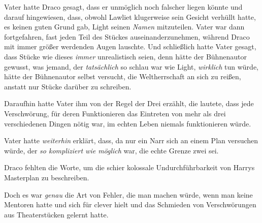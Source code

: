 Vater hatte Draco gesagt, dass er unmöglich noch falscher liegen könnte und darauf hingewiesen, dass, obwohl Lawliet klugerweise sein Gesicht verhüllt hatte, es keinen guten Grund gab, Light seinen \emph{Namen} mitzuteilen. Vater war dann fortgefahren, fast jeden Teil des Stückes auseinanderzunehmen, während Draco mit immer größer werdenden Augen lauschte. Und schließlich hatte Vater gesagt, dass Stücke wie dieses \emph{immer} unrealistisch seien, denn hätte der Bühnenautor gewusst, was jemand, der \emph{tatsächlich} so schlau war wie Light, \emph{wirklich} tun würde, hätte der Bühnenautor selbst versucht, die Weltherrschaft an sich zu reißen, anstatt nur Stücke darüber zu schreiben.

Daraufhin hatte Vater ihm von der Regel der Drei erzählt, die lautete, dass jede Verschwörung, für deren Funktionieren das Eintreten von mehr als drei verschiedenen Dingen nötig war, im echten Leben niemals funktionieren würde.

Vater hatte \emph{weiterhin} erklärt, dass, da nur ein Narr sich an einem Plan versuchen würde, der \emph{so kompliziert wie möglich} war, die echte Grenze zwei sei.

Draco fehlten die Worte, um die schier kolossale Undurchführbarkeit von Harrys Masterplan zu beschreiben.

Doch es war \emph{genau} die Art von Fehler, die man machen würde, wenn man keine Mentoren hatte und sich für clever hielt und das Schmieden von Verschwörungen aus Theaterstücken gelernt hatte.

